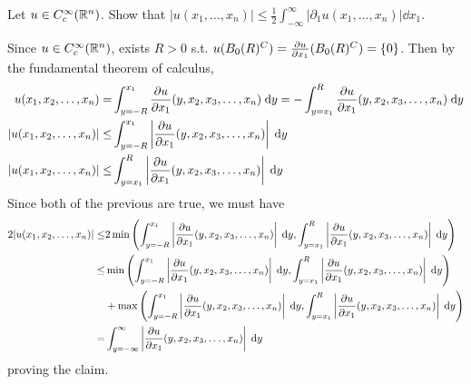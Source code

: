 Let $u \in C_c^\infty(\reals^n)$.
Show that $|u(x_1, \ldots, x_n)| \leq \frac{1}{2} \int_{-\infty}^{\infty} |\partial_1 u(x_1, \ldots, x_n)| \dd{x_1}$.

Since $u \in C_c^\infty(\reals^n)$, exists $R > 0$ s.t. $u(\ball{R}{0}^C) = \pderiv{u}{x_1}(\ball{R}{0}^C) = \set{0}$.
Then by the fundamental theorem of calculus,
\begin{align*}
u(x_1, x_2, \ldots, x_n) = &\int_{y=-R}^{x_1} \pderiv{u}{x_1}(y, x_2, x_3, \ldots, x_n) \dy
  = -\int_{y=x_1}^{R} \pderiv{u}{x_1}(y, x_2, x_3, \ldots, x_n) \dy\\
|u(x_1, x_2, \ldots, x_n)| \leq &\int_{y=-R}^{x_1} \left| \pderiv{u}{x_1}(y, x_2, x_3, \ldots, x_n) \right| \dy\\
|u(x_1, x_2, \ldots, x_n)| \leq &\int_{y=x_1}^{R} \left| \pderiv{u}{x_1}(y, x_2, x_3, \ldots, x_n) \right| \dy
\end{align*}
Since both of the previous are true, we must have
\begin{align*}
2 |u(x_1, x_2, \ldots, x_n)|
  \leq &2 \min \left(\int_{y=-R}^{x_1} \left| \pderiv{u}{x_1}(y, x_2, x_3, \ldots, x_n) \right| \dy,
                     \int_{y=x_1}^{R} \left| \pderiv{u}{x_1}(y, x_2, x_3, \ldots, x_n) \right| \dy \right)\\
  \leq& \min \left(\int_{y=-R}^{x_1} \left| \pderiv{u}{x_1}(y, x_2, x_3, \ldots, x_n) \right| \dy,
              \int_{y=x_1}^{R} \left| \pderiv{u}{x_1}(y, x_2, x_3, \ldots, x_n) \right| \dy \right)\\
  & + \max \left(\int_{y=-R}^{x_1} \left| \pderiv{u}{x_1}(y, x_2, x_3, \ldots, x_n) \right| \dy,
              \int_{y=x_1}^{R} \left| \pderiv{u}{x_1}(y, x_2, x_3, \ldots, x_n) \right| \dy \right)\\
  = &\int_{y=-\infty}^{\infty} \left| \pderiv{u}{x_1}(y, x_2, x_3, \ldots, x_n) \right| \dy
\end{align*}
proving the claim.
